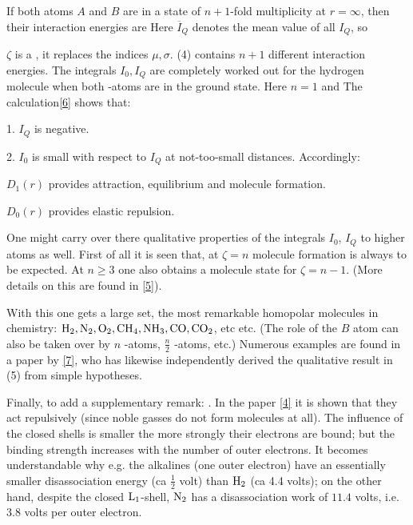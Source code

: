 \begin{paper}{1}
If both atoms $A$ and $B$ are in a state of $n+1$-fold multiplicity at $r=\infty$, then their interaction energies are
Here $\overline{I}_Q$ denotes the mean value of all $I_Q$, so

$\zeta$ is a , it replaces the indices $\mu,\sigma$. (4) contains $n+1$ different interaction energies. The integrals $I_0, I_Q$ are completely worked out for the hydrogen molecule when both -atoms are in the ground state. Here $n=1$ and
The calculation\ref{6} shows that:

1. $I_Q$ is negative.

2. $I_0$ is small with respect to $I_Q$ at not-too-small distances. Accordingly:

$D_1(r)$ provides attraction, equilibrium and molecule formation.

$D_0(r)$ provides elastic repulsion.

One might  carry over there qualitative properties of the integrals $I_0$, $I_Q$ to higher atoms as well. First of all it is seen that, at $\zeta=n$
molecule formation is always to be expected. At $n\geq 3$ one also obtains a molecule state for $\zeta=n-1$. (More details on this are found in \ref{5}).

With this one gets a large set, the most remarkable homopolar molecules in chemistry: $\text{H}_2, \text{N}_2, \text{O}_2, \text{CH}_4, \text{NH}_3, \text{CO}, \text{CO}_2$, etc etc. (The role of the $B$ atom can also be taken over by $n$ -atoms, $\frac{n}{2}$ -atoms, etc.) Numerous examples are found in a paper by \citeauthor{F. London}\ref{7}, who has likewise independently derived the qualitative result in (5) from simple hypotheses.

Finally, to add a supplementary remark: . In the paper \ref{4} it is shown that they act repulsively (since noble gasses do not form molecules at all). The influence of the closed shells is smaller the more strongly their electrons are bound; but the binding strength increases with the number of outer electrons. It becomes understandable why e.g. the alkalines (one outer electron) have an essentially smaller disassociation energy (ca $\frac{1}{2}$ volt) than $\text{H}_2$ (ca 4.4 volts); on the other hand, despite the closed $\text{L}_1$-shell, $\text{N}_2$ has a disassociation work of $11.4$ volts, i.e. 3.8 volts per outer electron.
\end{paper}
